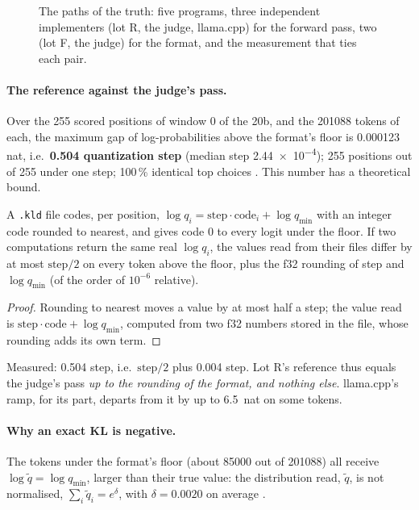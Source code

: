 \begin{figure}[ht]
\centering
\SchemaResChemins
\caption[The paths of the truth]{The paths of the truth: five programs, three independent implementers (lot R, the judge, llama.cpp) for the forward pass, two (lot F, the judge) for the format, and the measurement that ties each pair.}
\label{t2e-fig:chemins}
\end{figure}

\paragraph{The reference against the judge's pass.} Over the 255 scored positions of window 0 of the 20b, and the \num{201088} tokens of each, the maximum gap of log-probabilities above the format's floor is \num{0.000123} nat, i.e.\ \textbf{\num{0.504} quantization step} (median step \num{2.44e-4}); 255 positions out of 255 under one step; \num{100}\,\% identical top choices \mes. This number has a theoretical bound.

\begin{proposition}\label{t2e-prop:format}
A \texttt{.kld} file codes, per position, $\log q_i = \text{step} \cdot \text{code}_i + \log q_{\min}$ with an integer code rounded to nearest, and gives code 0 to every logit under the floor. If two computations return the same real $\log q_i$, the values read from their files differ by at most $\text{step}/2$ on every token above the floor, plus the f32 rounding of step and $\log q_{\min}$ (of the order of $10^{-6}$ relative).
\end{proposition}
\begin{proof}
Rounding to nearest moves a value by at most half a step; the value read is $\text{step} \cdot \text{code} + \log q_{\min}$, computed from two f32 numbers stored in the file, whose rounding adds its own term.
\end{proof}

Measured: \num{0.504} step, i.e.\ $\text{step}/2$ plus \num{0.004} step. Lot R's reference thus equals the judge's pass \emph{up to the rounding of the format, and nothing else}. llama.cpp's ramp, for its part, departs from it by up to \SI{6.5}{nat} on some tokens.

\paragraph{Why an exact KL is negative.} The tokens under the format's floor (about \num{85000} out of \num{201088}) all receive $\log \tilde q = \log q_{\min}$, larger than their true value: the distribution read, $\tilde q$, is not normalised, $\sum_i \tilde q_i = e^{\delta}$, with $\delta = \num{0.0020}$ on average \mes.


